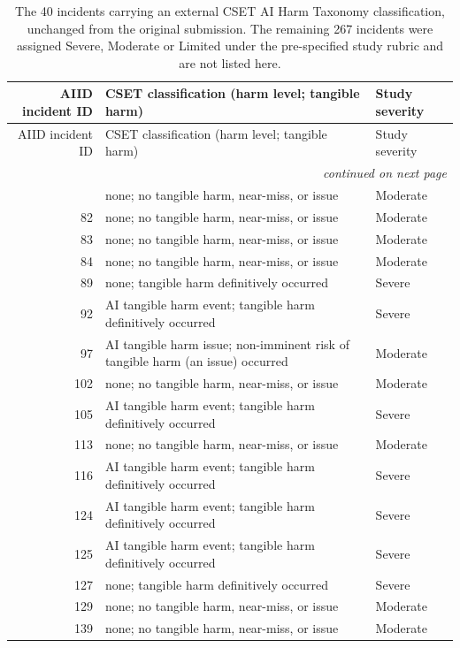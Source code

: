 \documentclass[11pt]{article}
\renewcommand{\arraystretch}{1.12}
\begin{document}
{\scriptsize\renewcommand{\arraystretch}{1.0}
\begin{longtable}{@{}r p{8.6cm} l@{}}
\caption{The 40 incidents carrying an external CSET AI Harm Taxonomy classification, unchanged from the original submission. The remaining 267 incidents were assigned Severe, Moderate or Limited under the pre-specified study rubric and are not listed here.}\\
\toprule
AIID incident ID & CSET classification (harm level; tangible harm) & Study severity \\ \midrule
\endfirsthead
\toprule
AIID incident ID & CSET classification (harm level; tangible harm) & Study severity \\ \midrule
\endhead
\midrule \multicolumn{3}{r}{\emph{continued on next page}}\\
\endfoot
\bottomrule
\endlastfoot
81 & none; no tangible harm, near-miss, or issue & Moderate \\
82 & none; no tangible harm, near-miss, or issue & Moderate \\
83 & none; no tangible harm, near-miss, or issue & Moderate \\
84 & none; no tangible harm, near-miss, or issue & Moderate \\
89 & none; tangible harm definitively occurred & Severe \\
92 & AI tangible harm event; tangible harm definitively occurred & Severe \\
97 & AI tangible harm issue; non-imminent risk of tangible harm (an issue) occurred & Moderate \\
102 & none; no tangible harm, near-miss, or issue & Moderate \\
105 & AI tangible harm event; tangible harm definitively occurred & Severe \\
113 & none; no tangible harm, near-miss, or issue & Moderate \\
116 & AI tangible harm event; tangible harm definitively occurred & Severe \\
124 & AI tangible harm event; tangible harm definitively occurred & Severe \\
125 & AI tangible harm event; tangible harm definitively occurred & Severe \\
127 & none; tangible harm definitively occurred & Severe \\
129 & none; no tangible harm, near-miss, or issue & Moderate \\
139 & none; no tangible harm, near-miss, or issue & Moderate \\

\end{longtable}}
\end{document}
